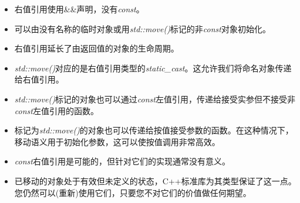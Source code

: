 \begin{itemize}
	\item 右值引用使用\&\&声明，没有\textit{const}。
	\item 可以由没有名称的临时对象或用\textit{std::move()}标记的非\textit{const}对象初始化。
	\item 右值引用延长了由返回值的对象的生命周期。
	\item \textit{std::move()}对应的是右值引用类型的\textit{static\_cast}。这允许我们将命名对象传递给右值引用。
	\item \textit{std::move()}标记的对象也可以通过\textit{const}左值引用，传递给接受实参但不接受非\textit{const}左值引用的函数。
	\item 标记为\textit{std::move()}的对象也可以传递给按值接受参数的函数。在这种情况下，移动语义用于初始化参数，这可以使按值调用非常高效。
	\item \textit{const}右值引用是可能的，但针对它们的实现通常没有意义。
	\item 已移动的对象处于有效但未定义的状态，C++标准库为其类型保证了这一点。您仍然可以(重新)使用它们，只要您不对它们的价值做任何期望。
\end{itemize}

\newpage